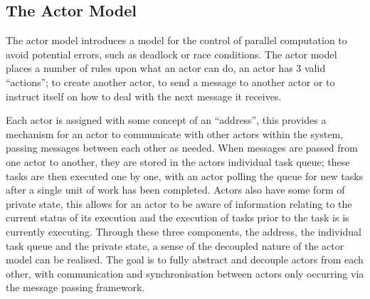 \documentclass{article}
\begin{document}
	\subsection{The Actor Model}
	The actor model introduces a model for the control of parallel computation to avoid potential errors, such as deadlock or race conditions. The actor model places a number of rules upon what an actor can do, an actor has 3 valid “actions”; to create another actor, to send a message to another actor or to instruct itself on how to deal with the next message it receives.
	
	Each actor is assigned with some concept of an “address”, this provides a mechanism for an actor to communicate with other actors within the system, passing messages between each other as needed. When messages are passed from one actor to another, they are stored in the actors individual task queue; these tasks are then executed one by one, with an actor polling the queue for new tasks after a single unit of work has been completed. Actors also have some form of private state, this allows for an actor to be aware of information relating to the current status of its execution and the execution of tasks prior to the task is is currently executing. Through these three components, the address, the individual task queue and the private state, a sense of the decoupled nature of the actor model can be realised. The goal is to fully abstract and decouple actors from each other, with communication and synchronisation between actors only occurring via the message passing framework.
	
\end{document}
